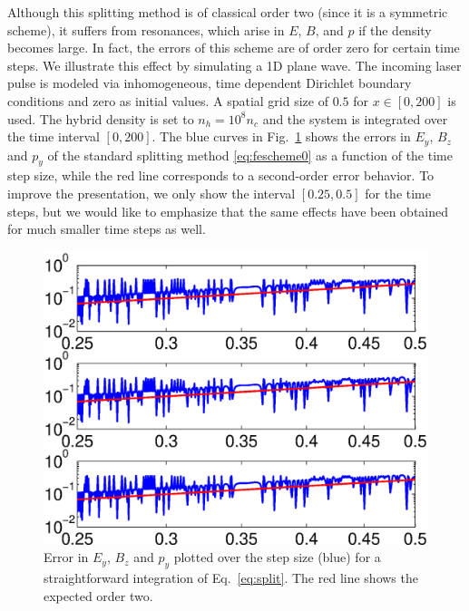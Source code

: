 \documentclass[conference]{IEEEtran}
\renewcommand{\~}{\widetilde }
\begin{document}
Although  this splitting method is of classical order two (since it
is a symmetric scheme), 
it suffers from resonances, which arise in $E$, $B$, and $p$ if the
density becomes large. In
fact, the errors of this
scheme are of order zero for certain time steps. 
We illustrate this effect by simulating a 1D plane wave. 
The incoming laser pulse is modeled via inhomogeneous, time dependent
Dirichlet boundary conditions and zero as initial values. A 
spatial grid size of $0.5$ for $x\in[0,200]$ is used. The hybrid density is
set to $n_h=10^8n_c$ and the system is integrated over the
time interval $[0,200]$. The blue curves in Fig.~\ref{fig:nofilter} 
shows the errors in $E_y$, $B_z$ and $p_y$ of the standard splitting method
\eqref{eq:fescheme0} as a function of the time step size, while the
red line corresponds to a second-order error behavior. To improve the
presentation, we only show the interval $[0.25,0.5]$ for the time steps, 
but we would like to emphasize that the same effects have been obtained
for much smaller time steps as well.

\begin{figure}[H]
 \begin{center}
 \includegraphics[width=1.0\columnwidth,keepaspectratio]{err_n8_dx5_110160_without_f.eps}
\end{center}
\caption{Error in $E_y$, $B_z$ and $p_y$ plotted over the step size (blue) for
a straightforward integration of Eq.~\eqref{eq:split}. The red line shows 
the expected order two.}
\label{fig:nofilter}
\end{figure}
\end{document}
